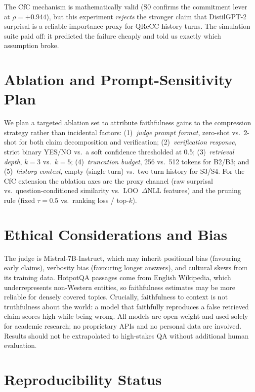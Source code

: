 \documentclass[runningheads]{llncs}
\begin{document}
The CfC mechanism is mathematically valid (S0 confirms the commitment lever at
$\rho=+0.944$), but this experiment \emph{rejects} the stronger claim that
DistilGPT-2 surprisal is a reliable importance proxy for QReCC history turns.
The simulation suite paid off: it predicted the failure cheaply and told us
exactly which assumption broke.

\section{Ablation and Prompt-Sensitivity Plan}\label{sec:ablation}

We plan a targeted ablation set to attribute faithfulness gains to the
compression strategy rather than incidental factors: (1)~\emph{judge prompt
format}, zero-shot vs.\ 2-shot for both claim decomposition and verification;
(2)~\emph{verification response}, strict binary YES/NO vs.\ a soft confidence
thresholded at 0.5; (3)~\emph{retrieval depth}, $k=3$ vs.\ $k=5$;
(4)~\emph{truncation budget}, 256 vs.\ 512 tokens for B2/B3; and
(5)~\emph{history context}, empty (single-turn) vs.\ two-turn history for S3/S4.
For the CfC extension the ablation axes are the proxy channel (raw surprisal vs.\
question-conditioned similarity vs.\ LOO~$\Delta$NLL features) and the pruning
rule (fixed $\tau=0.5$ vs.\ ranking loss / top-$k$).

\section{Ethical Considerations and Bias}

The judge is Mistral-7B-Instruct, which may inherit positional bias (favouring
early claims), verbosity bias (favouring longer answers), and cultural skews
from its training data. HotpotQA passages come from English Wikipedia, which
underrepresents non-Western entities, so faithfulness estimates may be more
reliable for densely covered topics. Crucially, faithfulness to context is not
truthfulness about the world: a model that faithfully reproduces a false
retrieved claim scores high while being wrong. All models are open-weight and
used solely for academic research; no proprietary APIs and no personal data are
involved. Results should not be extrapolated to high-stakes QA without
additional human evaluation.

\section{Reproducibility Status}
\end{document}
